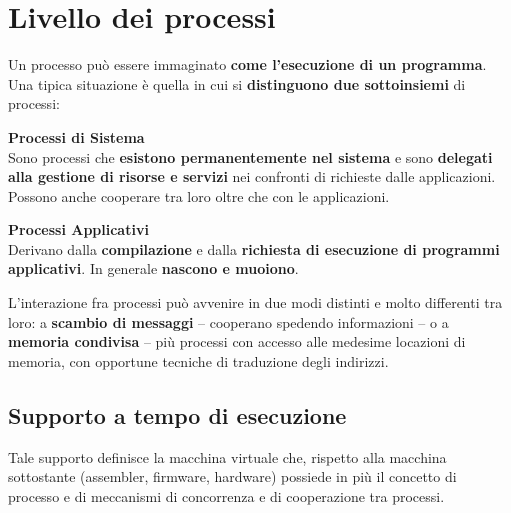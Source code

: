 \documentclass[10pt]{report}
\begin{document}
\chapter{Livello dei processi}
Un processo può essere immaginato \textbf{come l'esecuzione di un programma}. Una tipica situazione è quella in cui si \textbf{distinguono due sottoinsiemi} di processi:
\begin{list}{}{}
	\item \textbf{Processi di Sistema}\\
	Sono processi che \textbf{esistono permanentemente nel sistema} e sono \textbf{delegati alla gestione di risorse e servizi} nei confronti di richieste dalle applicazioni. Possono anche cooperare tra loro oltre che con le applicazioni.
	\item \textbf{Processi Applicativi}\\
	Derivano dalla \textbf{compilazione} e dalla \textbf{richiesta di esecuzione di programmi applicativi}. In generale \textbf{nascono e muoiono}.
\end{list}
L'interazione fra processi può avvenire in due modi distinti e molto differenti tra loro: a \textbf{scambio di messaggi} -- cooperano spedendo informazioni -- o a \textbf{memoria condivisa} -- più processi con accesso alle medesime locazioni di memoria, con opportune tecniche di traduzione degli indirizzi.
\section{Supporto a tempo di esecuzione}
Tale supporto definisce la macchina virtuale che, rispetto alla macchina sottostante (assembler, firmware, hardware) possiede in più il concetto di processo e di meccanismi di concorrenza e di cooperazione tra processi.
\end{document}
